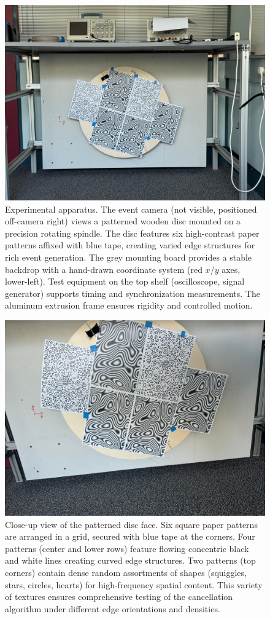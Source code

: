 \begin{figure}[t]
  \centering
  \includegraphics[width=0.85\linewidth]{../images/setup_2.jpeg}
  \caption{Experimental apparatus. The event camera (not visible, positioned off-camera right) views a patterned wooden disc mounted on a precision rotating spindle. The disc features six high-contrast paper patterns affixed with blue tape, creating varied edge structures for rich event generation. The grey mounting board provides a stable backdrop with a hand-drawn coordinate system (red $x$/$y$ axes, lower-left). Test equipment on the top shelf (oscilloscope, signal generator) supports timing and synchronization measurements. The aluminum extrusion frame ensures rigidity and controlled motion.}
  \label{fig:rig}
\end{figure}

\begin{figure}[t]
  \centering
  \includegraphics[width=0.7\linewidth]{../images/setup_1.jpeg}
  \caption{Close-up view of the patterned disc face. Six square paper patterns are arranged in a grid, secured with blue tape at the corners. Four patterns (center and lower rows) feature flowing concentric black and white lines creating curved edge structures. Two patterns (top corners) contain dense random assortments of shapes (squiggles, stars, circles, hearts) for high-frequency spatial content. This variety of textures ensures comprehensive testing of the cancellation algorithm under different edge orientations and densities.}
  \label{fig:disc}
\end{figure}

